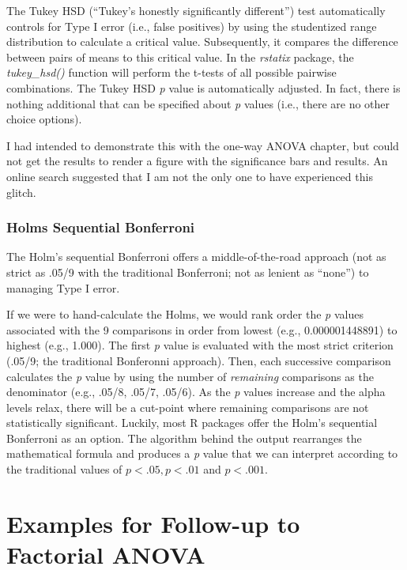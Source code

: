 \documentclass[
  11pt,
]{book}
\begin{document}
The Tukey HSD (``Tukey's honestly significantly different'') test automatically controls for Type I error (i.e., false positives) by using the studentized range distribution to calculate a critical value. Subsequently, it compares the difference between pairs of means to this critical value. In the \emph{rstatix} package, the \emph{tukey\_hsd()} function will perform the t-tests of all possible pairwise combinations. The Tukey HSD \emph{p} value is automatically adjusted. In fact, there is nothing additional that can be specified about \emph{p} values (i.e., there are no other choice options).

I had intended to demonstrate this with the one-way ANOVA chapter, but could not get the results to render a figure with the significance bars and results. An online search suggested that I am not the only one to have experienced this glitch.

\hypertarget{holms-sequential-bonferroni}{%
\subsection*{Holms Sequential Bonferroni}\label{holms-sequential-bonferroni}}


The Holm's sequential Bonferroni \citep{green_using_2017} offers a middle-of-the-road approach (not as strict as .05/9 with the traditional Bonferroni; not as lenient as ``none'') to managing Type I error.

If we were to hand-calculate the Holms, we would rank order the \emph{p} values associated with the 9 comparisons in order from lowest (e.g., 0.000001448891) to highest (e.g., 1.000). The first \emph{p} value is evaluated with the most strict criterion (.05/9; the traditional Bonferonni approach). Then, each successive comparison calculates the \emph{p} value by using the number of \emph{remaining} comparisons as the denominator (e.g., .05/8, .05/7, .05/6). As the \emph{p} values increase and the alpha levels relax, there will be a cut-point where remaining comparisons are not statistically significant. Luckily, most R packages offer the Holm's sequential Bonferroni as an option. The algorithm behind the output rearranges the mathematical formula and produces a \emph{p} value that we can interpret according to the traditional values of \(p < .05, p < .01\) and \(p < .001\). \citep{green_using_2017}

\hypertarget{moRe}{%
\chapter{Examples for Follow-up to Factorial ANOVA}\label{moRe}}
\end{document}
